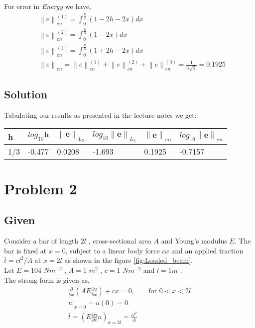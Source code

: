 \documentclass[a4paper]{memoir}
\begin{document}
For error  in \textit{Energy} we have,
\begin{align*}
	& \left\|e \right\|_{en}^{(1)} = \int_{0}^{\frac{h}{3}} (1-2 h-2 x) dx \\
	& \left\|e \right\|_{en}^{(2)} = \int_{0}^{\frac{h}{3}} (1-2 x) dx \\
	& \left\|e \right\|_{en}^{(3)} = \int_{0}^{\frac{h}{3}} (1+2 h-2 x) dx \\
	& \left\|e \right\|_{en} = \left\|e \right\|_{en}^{(1)} + \left\|e \right\|_{en}^{(2)} + \left\|e \right\|_{en}^{(3)} = \frac{1}{3\sqrt{3}} = 0.1925
\end{align*} 

\subsection{Solution}
Tabulating our results as presented in the lecture notes we get:
\begin{center}
	\begin{tabular}{l|l||l|l||l|l}
		\hline
		\textbf{h} & $log_{10}\textbf{h}$ &	$\left\|\textbf{e} \right\|_{L_2}$ & $log_{10} \left\|\textbf{e} \right\|_{L_2}$ & $\left\|\textbf{e} \right\|_{en}$ & $log_{10} \left\|\textbf{e} \right\|_{en}$  \\ 
		\hline \hline
		1/3 & -0.477 & 0.0208 & -1.693 & 0.1925 & -0.7157 \\
		\hline
	\end{tabular}
\end{center}

\section{Problem 2}
\subsection{Given}
Consider a bar of length $2l$ , cross-sectional area $A$ and Young’s modulus $E$. The bar is fixed at $x=0$, subject to a linear body force $cx$ and an applied traction $\bar{t} = cl^2/A$ at $x=2l$ as shown in the figure \ref{fig:Loaded_beam}. \\

Let $E = 104$ $Nm^{−2}$ , $A = 1$ $m^2$ , $c = 1$ $Nm^{−2}$ and $l = 1 m$ . \\

The strong form is given as,
\begin{align}
  & \frac{\partial }{\partial x}\left( AE \frac{\partial u}{\partial x} \right) +cx =0,& &\text{for } 0<x<2l& \\ 
  & u|_{x=0} = u(0) = 0 \nonumber \\
  & \bar{t} = \left( E \frac{\partial u}{\partial x}n \right)_{x=2l} = \frac{cl^2}{A} \nonumber
\end{align}
\end{document}
